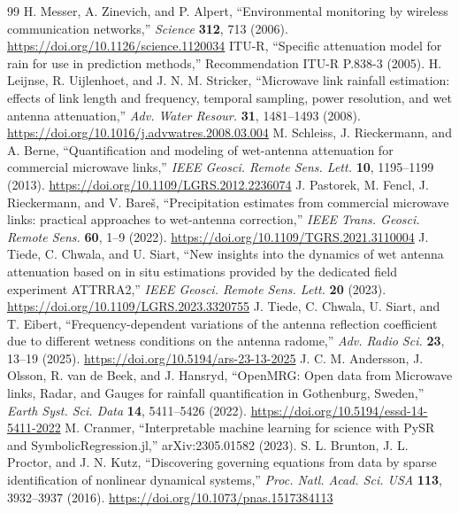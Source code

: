 \documentclass[reprint,aps,pra,amsmath,amssymb,nofootinbib,superscriptaddress]{revtex4-2}
\begin{document}
\begin{thebibliography}{99}
 H. Messer, A. Zinevich, and P. Alpert, ``Environmental monitoring by wireless communication
networks,'' \emph{Science} \textbf{312}, 713 (2006). \url{https://doi.org/10.1126/science.1120034}
 ITU-R, ``Specific attenuation model for rain for use in prediction methods,'' Recommendation ITU-R P.838-3
(2005).
 H. Leijnse, R. Uijlenhoet, and J. N. M. Stricker, ``Microwave link rainfall estimation: effects of link
length and frequency, temporal sampling, power resolution, and wet antenna attenuation,'' \emph{Adv. Water Resour.}
\textbf{31}, 1481--1493 (2008). \url{https://doi.org/10.1016/j.advwatres.2008.03.004}
 M. Schleiss, J. Rieckermann, and A. Berne, ``Quantification and modeling of wet-antenna attenuation for
commercial microwave links,'' \emph{IEEE Geosci. Remote Sens. Lett.} \textbf{10}, 1195--1199 (2013).
\url{https://doi.org/10.1109/LGRS.2012.2236074}
 J. Pastorek, M. Fencl, J. Rieckermann, and V. Bare\v{s}, ``Precipitation estimates from commercial
microwave links: practical approaches to wet-antenna correction,'' \emph{IEEE Trans. Geosci. Remote Sens.} \textbf{60},
1--9 (2022). \url{https://doi.org/10.1109/TGRS.2021.3110004}
 J. Tiede, C. Chwala, and U. Siart, ``New insights into the dynamics of wet antenna attenuation based on
in situ estimations provided by the dedicated field experiment ATTRRA2,'' \emph{IEEE Geosci. Remote Sens. Lett.}
\textbf{20} (2023). \url{https://doi.org/10.1109/LGRS.2023.3320755}
 J. Tiede, C. Chwala, U. Siart, and T. Eibert, ``Frequency-dependent variations of the antenna reflection
coefficient due to different wetness conditions on the antenna radome,'' \emph{Adv. Radio Sci.} \textbf{23}, 13--19 (2025).
\url{https://doi.org/10.5194/ars-23-13-2025}
 J. C. M. Andersson, J. Olsson, R. van de Beek, and J. Hansryd, ``OpenMRG: Open data from Microwave links,
Radar, and Gauges for rainfall quantification in Gothenburg, Sweden,'' \emph{Earth Syst. Sci. Data} \textbf{14}, 5411--5426
(2022). \url{https://doi.org/10.5194/essd-14-5411-2022}
 M. Cranmer, ``Interpretable machine learning for science with PySR and SymbolicRegression.jl,''
arXiv:2305.01582 (2023).
 S. L. Brunton, J. L. Proctor, and J. N. Kutz, ``Discovering governing equations from data by sparse
identification of nonlinear dynamical systems,'' \emph{Proc. Natl. Acad. Sci. USA} \textbf{113}, 3932--3937 (2016).
\url{https://doi.org/10.1073/pnas.1517384113}
\end{thebibliography}
\end{document}
